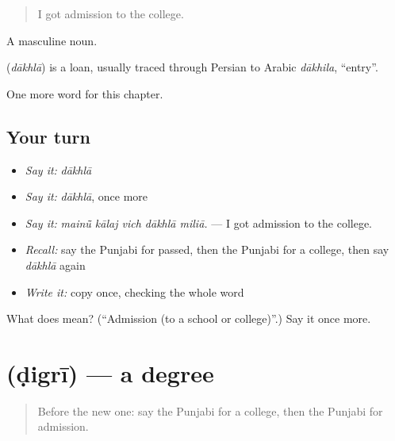 \begin{quote}
I got admission to the college.
\end{quote}

A masculine noun.

\begin{cousinweb}
\textbf{} (\emph{dākhlā}) is a loan, usually traced through Persian to Arabic \emph{dākhila}, \textquotedblleft{}entry\textquotedblright{}.
\end{cousinweb}

\begin{grammarlens}[title={What you've built}]
One more word for this chapter.
\end{grammarlens}

\subsection*{Your turn}
\begin{itemize}
\raggedright
  \item \emph{Say it:} \emph{dākhlā}
  \item \emph{Say it:} \emph{dākhlā}, once more
  \item \emph{Say it:} \emph{mainū̃ kālaj vich dākhlā miliā.} — I got admission to the college.
  \item \emph{Recall:} say the Punjabi for passed, then the Punjabi for a college, then say \emph{dākhlā} again
  \item \emph{Write it:} copy \textbf{} once, checking the whole word
\end{itemize}

\begin{tcolorbox}[breakable,colback=teal!4,colframe=teal!35!black,title={Before you move on}]
What does  mean? (\textquotedblleft{}Admission (to a school or college)\textquotedblright{}.) Say it once more.
\end{tcolorbox}
\section[\texorpdfstring{\pa{ਡਿਗਰੀ} (ḍigrī)}{ਡਿਗਰੀ (ḍigrī)}]{ (ḍigrī) — a degree}

\label{lesson:PA-C361-digri}



\begin{quote}
Before the new one: say the Punjabi for a college, then the Punjabi for admission.
\end{quote}

